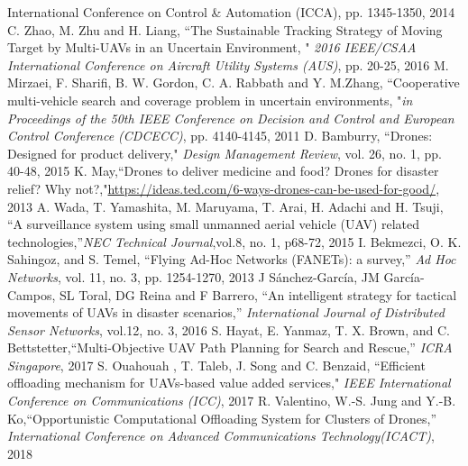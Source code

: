 \documentclass{ieeeaccess}
\begin{document}
\begin{thebibliography}{1}
{International Conference on Control \& Automation (ICCA)}, pp. 1345-1350, 2014 
 C. Zhao, M. Zhu and H. Liang, ``The Sustainable Tracking Strategy of Moving Target by Multi-UAVs in an Uncertain Environment, " \emph{2016 IEEE/CSAA International Conference on Aircraft Utility Systems (AUS)}, pp. 20-25, 2016
 M. Mirzaei, F. Sharifi, B. W. Gordon, C. A. Rabbath and  Y. M.Zhang, ``Cooperative multi-vehicle search and coverage problem in uncertain environments, "\emph{in Proceedings of the 50th IEEE Conference on Decision and Control and European Control Conference (CDCECC)}, pp. 4140-4145, 2011
%
 D. Bamburry, ``Drones: Designed for product delivery," \emph{Design Management Review}, vol. 26, no. 1, pp. 40-48, 2015
K. May,``Drones to deliver medicine and food? Drones for disaster relief? Why not?,"\url{https://ideas.ted.com/6-ways-drones-can-be-used-for-good/}, 2013
A. Wada, T. Yamashita, M. Maruyama, T. Arai, H. Adachi and H. Tsuji, ``A surveillance system using small unmanned aerial vehicle (UAV) related technologies,''\emph{NEC Technical Journal},vol.8, no. 1, p68-72, 2015
 I. Bekmezci, O. K. Sahingoz, and S. Temel, “Flying Ad-Hoc Networks (FANETs): a survey,” \emph{Ad Hoc Networks}, vol. 11, no. 3, pp. 1254-1270, 2013
 J S\'anchez-Garc\'ia, JM Garc\'ia-Campos, SL Toral, DG Reina and F Barrero, ``An intelligent strategy for tactical movements of UAVs in disaster scenarios,''\emph{
International Journal of Distributed Sensor Networks}, vol.12, no. 3, 2016
S. Hayat, E. Yanmaz, T. X. Brown, and C. Bettstetter,``Multi-Objective UAV Path Planning for Search and Rescue,” \emph{ICRA Singapore}, 2017 
%
%
S. Ouahouah , T. Taleb, J. Song and C. Benzaid, ``Efficient offloading mechanism for UAVs-based value added services," \emph{IEEE International Conference on Communications (ICC)}, 2017
 R. Valentino, W.-S. Jung and Y.-B. Ko,``Opportunistic Computational Offloading System for Clusters of Drones,” \emph{International Conference on Advanced Communications Technology(ICACT)}, 2018 

\end{thebibliography}
\end{document}
